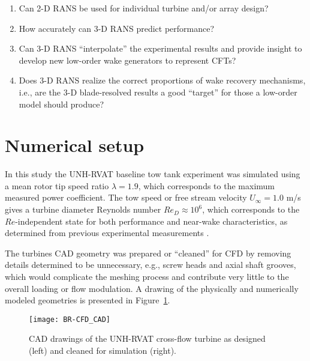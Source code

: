 \begin{enumerate}
    \item Can 2-D RANS be used for individual turbine and/or array design?

    \item How accurately can 3-D RANS predict performance?

    \item Can 3-D RANS ``interpolate'' the experimental results and provide
    insight to develop new low-order wake generators to represent CFTs?

    \item Does 3-D RANS realize the correct proportions of wake recovery
    mechanisms, i.e., are the 3-D blade-resolved results a good ``target'' for
    those a low-order model should produce?
\end{enumerate}


\section{Numerical setup}

In this study the UNH-RVAT baseline tow tank experiment was simulated using a
mean rotor tip speed ratio $\lambda=1.9$, which corresponds to the maximum
measured power coefficient. The tow speed or free stream velocity $U_\infty=1.0$
m/s gives a turbine diameter Reynolds number $Re_D \approx 10^6$, which
corresponds to the $Re$-independent state for both performance and near-wake
characteristics, as determined from previous experimental measurements
\cite{Bachant2014, Bachant2016-Energies}.

The turbines CAD geometry was prepared or ``cleaned'' for CFD by removing
details determined to be unnecessary, e.g., screw heads and axial shaft grooves,
which would complicate the meshing process and contribute very little to the
overall loading or flow modulation. A drawing of the physically and numerically
modeled geometries is presented in Figure~\ref{fig:cfd-cad}.

\begin{figure}
    \centering
    
    \texttt{[image: BR-CFD\_CAD]}
    
    \caption{CAD drawings of the UNH-RVAT cross-flow turbine as designed (left)
        and cleaned for simulation (right).}
    
    \label{fig:cfd-cad}
\end{figure}

